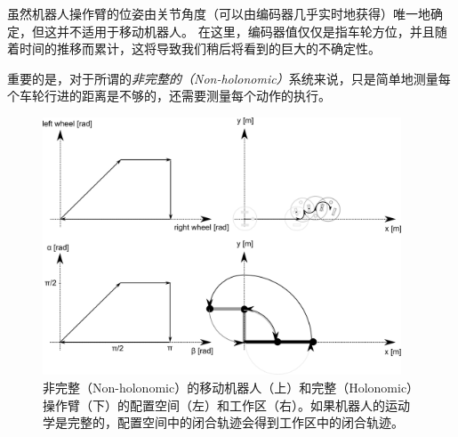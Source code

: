 虽然机器人操作臂的位姿由关节角度（可以由编码器几乎实时地获得）唯一地确定，但这并不适用于移动机器人。 在这里，编码器值仅仅是指车轮方位，并且随着时间的推移而累计，这将导致我们稍后将看到的巨大的不确定性。


重要的是，对于所谓的\emph{非完整的（Non-holonomic）}系统来说，只是简单地测量每个车轮行进的距离是不够的，还需要测量每个动作的执行。

\begin{figure}[htb!]
	\centering
		\includegraphics[width=0.95\textwidth]{figs/holonomy.png}
	\caption{非完整（Non-holonomic）的移动机器人（上）和完整（Holonomic）操作臂（下）的配置空间（左）和工作区（右）。如果机器人的运动学是完整的，配置空间中的闭合轨迹会得到工作区中的闭合轨迹。}
	\label{fig:holonomy}
\end{figure}


